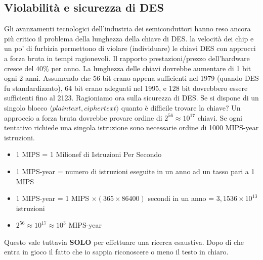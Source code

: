 \subsection{Violabilità e sicurezza di DES}
Gli avanzamenti tecnologici dell'industria dei semiconduttori hanno reso ancora più critico il problema della lunghezza della chiave di DES. la velocità dei chip e un po' di furbizia permettono di violare (individuare) le chiavi DES con approcci a forza bruta in tempi ragionevoli. Il rapporto prestazioni/prezzo dell'hardware cresce del
$40\%$ per anno. La lunghezza delle chiavi dovrebbe aumentare di 1 bit ogni 2 anni. Assumendo che 56 bit erano appena sufficienti nel 1979 (quando DES fu standardizzato), 64 bit erano adeguati nel 1995, e 128 bit dovrebbero essere sufficienti fino al 2123. \newline \newline Ragioniamo ora sulla sicurezza di DES. Se si dispone di un singolo blocco $\langle plaintext,ciphertext \rangle$ quanto è difficile trovare la chiave? Un approccio a forza bruta dovrebbe provare ordine di $2^{56} \approx 10^{17}$ chiavi. Se ogni tentativo richiede una singola istruzione sono necessarie ordine di 1000 MIPS-year istruzioni.
\begin{itemize}
  \item 1 MIPS = 1 Milionef di Istruzioni Per Secondo
  \item 1 MIPS-year = numero di istruzioni eseguite in un anno ad un tasso pari a 1 MIPS
  \item 1 MIPS-year = 1 MIPS $\times(365 \times 86400)$ secondi in un anno = $3,1536 \times 10^{13}$ istruzioni
  \item $2^{56} \approx 10^{17} \approx 10^{3}$ MIPS-year
\end{itemize}
Questo vale tuttavia \textbf{SOLO} per effettuare una ricerca esaustiva. Dopo di che entra in gioco il fatto che io sappia riconoscere o meno il testo in chiaro.
